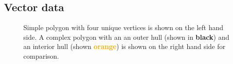 \subsection{Vector data}

\begin{figure}[htb]
  \centering
  
  \textcolor{gray}{\vrule}
  \hspace{0.01\linewidth}
  
  \caption{
    Simple polygon with four unique vertices is shown on the left hand side.
    A complex polygon with an an outer hull (shown in \textbf{black})
    and an interior hull (shown \textcolor{orange}{\textbf{orange}}) is shown on the right hand side for comparison.
  }
\end{figure}
